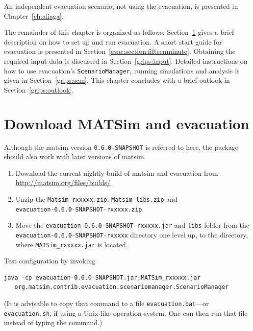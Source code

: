 An independent evacuation scenario, not using the evacuation, is presented in Chapter~\ref{ch:aliaga}.

The remainder of this chapter is organized as follows: Section~\ref{grips:install} gives a brief description on how to set up and run evacuation. 
A short start guide for evacuation is presented in Section~\ref{evac:section:fifteenminute}. Obtaining the required input data is discussed in Section~\ref{grips:input}. Detailed instructions on how to use evacuation's \lstinline|ScenarioManager|, running simulations and analysis is given in Section~\ref{grips:scm}. This chapter concludes with a brief outlook in Section~\ref{grips:outlook}.

\section{Download MATSim and evacuation}
\label{grips:install}
Although the \gls{matsim} version \lstinline|0.6.0-SNAPSHOT| is referred to here, the package should also work with later versions of \gls{matsim}.
\begin{enumerate}\styleEnumerate
\item 
Download the current nightly build of \gls{matsim} and evacuation from
\url{http://matsim.org/files/builds/}
\item 
Unzip the \lstinline|Matsim_rxxxxx.zip|, \lstinline|Matsim_libs.zip| and\\
 \lstinline|evacuation-0.6.0-SNAPSHOT-rxxxxx.zip|.
\item 
Move the \lstinline|evacuation-0.6.0-SNAPSHOT-rxxxxx.jar| and \lstinline|libs| folder from the \lstinline|evacuation-0.6.0-SNAPSHOT-rxxxxx| directory one level up, 
\ie to the directory, where \lstinline|MATSim_rxxxxx.jar| is located.
\end{enumerate}

Test configuration by invoking\\ 
\begin{lstlisting}
java -cp evacuation-0.6.0-SNAPSHOT.jar;MATSim_rxxxxx.jar
   org.matsim.contrib.evacuation.scenariomanager.ScenarioManager
\end{lstlisting}
(It is advisable to copy that command to a file \lstinline|evacuation.bat|---or \lstinline|evacuation.sh|, if using a Unix-like operation system. One can then run that file instead of typing the command.)

